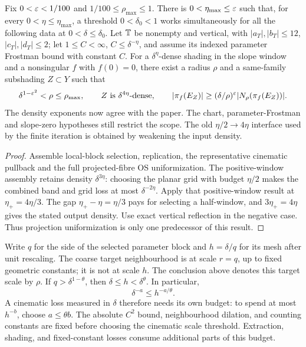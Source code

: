 \begin{lemma}
\label{lem:projection-one-step-normalized}
\leanok
{}
Fix $0<\varepsilon<1/100$ and $1/100\leq\rho_{\max}\leq1$.
There is $0<\eta_{\max}\leq\varepsilon$ such that, for every
$0<\eta\leq\eta_{\max}$, a threshold $0<\delta_0<1$ works
simultaneously for all the following data at $0<\delta\leq\delta_0$.
Let $\mathbb{T}$ be nonempty and vertical, with
$|a_T|,|b_T|\leq12$, $|c_T|,|d_T|\leq2$; let
$1\leq C<\infty$, $C\leq\delta^{-\eta}$, and assume its indexed
parameter Frostman bound with constant $C$. For a
$\delta^\eta$-dense shading in the slope window and a nonsingular
$f$ with $f(0)=0$, there exist a radius $\rho$ and a same-family
subshading $Z\subset Y$ such that
\[
 \delta^{1-\varepsilon^2}<\rho\leq\rho_{\max},\qquad
 Z\text{ is }\delta^{4\eta}\text{-dense},\qquad
 |\pi_f(E_Z)|\geq(\delta/\rho)^\varepsilon|N_\rho(\pi_f(E_Z))|.
\]
The density exponents now agree with the paper. The chart,
parameter-Frostman and slope-zero hypotheses still restrict the scope.
The old $\eta/2\to4\eta$ interface used by the finite iteration is
obtained by weakening the input density.
\end{lemma}
\begin{proof}
\leanok
{}
Assemble local-block selection, replication, the representative cinematic
pullback and the full projected-fibre OS uniformization. The positive-window
assembly retains density $\delta^{3\eta}$: choosing the planar grid
with budget $\eta/2$ makes the combined band and grid loss at most
$\delta^{-2\eta}$. Apply that positive-window result at
$\eta_+=4\eta/3$. The gap $\eta_+-\eta=\eta/3$ pays for selecting
a half-window, and $3\eta_+=4\eta$ gives the stated output density.
Use exact vertical reflection in the negative case.
Thus projection uniformization is only one predecessor of this result.
\end{proof}

\begin{remark}
\label{rem:projection-scales}
Write $q$ for the side of the selected parameter block and
$h=\delta/q$ for its mesh after unit rescaling. The coarse target
neighbourhood is at scale $r=q$, up to fixed geometric constants;
it is not at scale $h$. The conclusion above denotes this target
scale by $\rho$.
If $q>\delta^{1-\theta}$, then $\delta\leq h<\delta^\theta$.
In particular,
\[
                  \delta^{-a}\leq h^{-a/\theta}.
\]
A cinematic loss measured in $\delta$ therefore needs its own
budget: to spend at most $h^{-b}$, choose $a\leq\theta b$.
The absolute $C^2$ bound, neighbourhood dilation, and counting
constants are fixed before choosing the cinematic scale threshold.
Extraction, shading, and fixed-constant losses consume additional
parts of this budget.
\end{remark}

